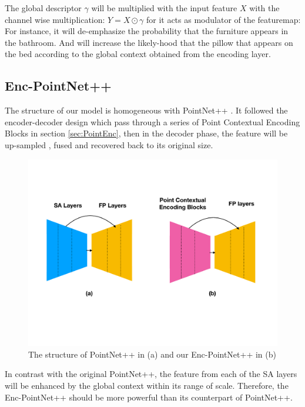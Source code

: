 \documentclass[runningheads]{llncs}
\begin{document}
The global descriptor $\gamma$ will be multiplied with the input feature $X$ with the channel wise multiplication: $Y=X\odot \gamma$ for it acts as modulator  of the featuremap: For instance, it will de-emphasize the probability that the furniture appears in the bathroom. And will increase the likely-hood that the pillow that appears on the bed according to the global context obtained from the encoding layer. 
\label{sec:PointEnc}


\subsection{Enc-PointNet++}
The structure of our model is homogeneous with PointNet++ \cite{pointnet++}. It followed the encoder-decoder design which pass through a series of Point Contextual Encoding Blocks in section \ref{sec:PointEnc}, then in the decoder phase, the feature will be up-sampled , fused and  recovered back to its original size. 

\begin{figure}[t]
\begin{minipage}{1.0\textwidth}
    \centering
    \includegraphics[width=.8\linewidth]{eccv2020kit/Figure/enc_pointnet++.pdf}
    \caption{The structure of PointNet++ in (a) and our Enc-PointNet++ in (b) }
\end{minipage}
\label{fig:enc_pointnet}
\end{figure}

In contrast with the original PointNet++, the feature from each of the SA layers will be enhanced by the global context within its range of scale.  Therefore, the Enc-PointNet++ should be more powerful than its counterpart of PointNet++.
\end{document}
